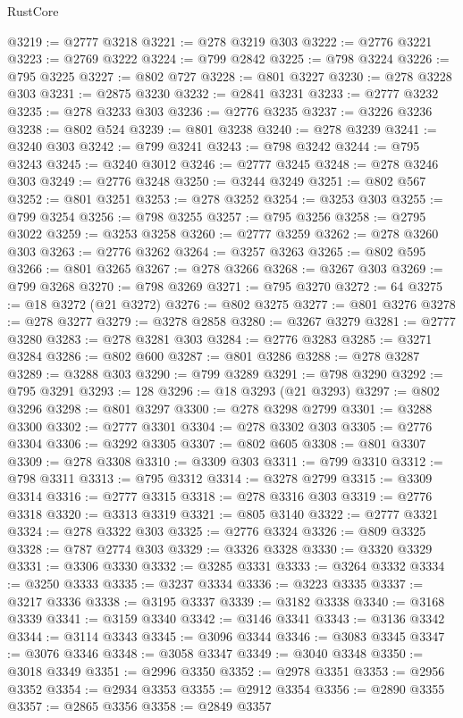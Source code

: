 \begin{lexlean}{RustCore}
\begin{coremodule}
@3219 := @2777 @3218
@3221 := @278 @3219 @303
@3222 := @2776 @3221
@3223 := @2769 @3222
@3224 := @799 @2842
@3225 := @798 @3224
@3226 := @795 @3225
@3227 := @802 @727
@3228 := @801 @3227
@3230 := @278 @3228 @303
@3231 := @2875 @3230
@3232 := @2841 @3231
@3233 := @2777 @3232
@3235 := @278 @3233 @303
@3236 := @2776 @3235
@3237 := @3226 @3236
@3238 := @802 @524
@3239 := @801 @3238
@3240 := @278 @3239
@3241 := @3240 @303
@3242 := @799 @3241
@3243 := @798 @3242
@3244 := @795 @3243
@3245 := @3240 @3012
@3246 := @2777 @3245
@3248 := @278 @3246 @303
@3249 := @2776 @3248
@3250 := @3244 @3249
@3251 := @802 @567
@3252 := @801 @3251
@3253 := @278 @3252
@3254 := @3253 @303
@3255 := @799 @3254
@3256 := @798 @3255
@3257 := @795 @3256
@3258 := @2795 @3022
@3259 := @3253 @3258
@3260 := @2777 @3259
@3262 := @278 @3260 @303
@3263 := @2776 @3262
@3264 := @3257 @3263
@3265 := @802 @595
@3266 := @801 @3265
@3267 := @278 @3266
@3268 := @3267 @303
@3269 := @799 @3268
@3270 := @798 @3269
@3271 := @795 @3270
@3272 := 64
@3275 := @18 @3272 (@21 @3272)
@3276 := @802 @3275
@3277 := @801 @3276
@3278 := @278 @3277
@3279 := @3278 @2858
@3280 := @3267 @3279
@3281 := @2777 @3280
@3283 := @278 @3281 @303
@3284 := @2776 @3283
@3285 := @3271 @3284
@3286 := @802 @600
@3287 := @801 @3286
@3288 := @278 @3287
@3289 := @3288 @303
@3290 := @799 @3289
@3291 := @798 @3290
@3292 := @795 @3291
@3293 := 128
@3296 := @18 @3293 (@21 @3293)
@3297 := @802 @3296
@3298 := @801 @3297
@3300 := @278 @3298 @2799
@3301 := @3288 @3300
@3302 := @2777 @3301
@3304 := @278 @3302 @303
@3305 := @2776 @3304
@3306 := @3292 @3305
@3307 := @802 @605
@3308 := @801 @3307
@3309 := @278 @3308
@3310 := @3309 @303
@3311 := @799 @3310
@3312 := @798 @3311
@3313 := @795 @3312
@3314 := @3278 @2799
@3315 := @3309 @3314
@3316 := @2777 @3315
@3318 := @278 @3316 @303
@3319 := @2776 @3318
@3320 := @3313 @3319
@3321 := @805 @3140
@3322 := @2777 @3321
@3324 := @278 @3322 @303
@3325 := @2776 @3324
@3326 := @809 @3325
@3328 := @787 @2774 @303
@3329 := @3326 @3328
@3330 := @3320 @3329
@3331 := @3306 @3330
@3332 := @3285 @3331
@3333 := @3264 @3332
@3334 := @3250 @3333
@3335 := @3237 @3334
@3336 := @3223 @3335
@3337 := @3217 @3336
@3338 := @3195 @3337
@3339 := @3182 @3338
@3340 := @3168 @3339
@3341 := @3159 @3340
@3342 := @3146 @3341
@3343 := @3136 @3342
@3344 := @3114 @3343
@3345 := @3096 @3344
@3346 := @3083 @3345
@3347 := @3076 @3346
@3348 := @3058 @3347
@3349 := @3040 @3348
@3350 := @3018 @3349
@3351 := @2996 @3350
@3352 := @2978 @3351
@3353 := @2956 @3352
@3354 := @2934 @3353
@3355 := @2912 @3354
@3356 := @2890 @3355
@3357 := @2865 @3356
@3358 := @2849 @3357

\end{coremodule}
\end{lexlean}
